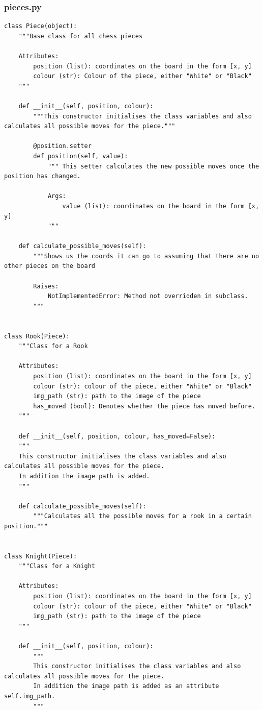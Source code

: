 \subsubsection{pieces.py}
\begin{verbatim}
class Piece(object):
	"""Base class for all chess pieces

	Attributes:
		position (list): coordinates on the board in the form [x, y]
		colour (str): Colour of the piece, either "White" or "Black"
	"""
	
 	def __init__(self, position, colour):
		"""This constructor initialises the class variables and also calculates all possible moves for the piece."""
		
		@position.setter
		def position(self, value):
			""" This setter calculates the new possible moves once the position has changed.
		
			Args:
				value (list): coordinates on the board in the form [x, y]
			"""
	
 	def calculate_possible_moves(self):
		"""Shows us the coords it can go to assuming that there are no other pieces on the board
	
		Raises:
			NotImplementedError: Method not overridden in subclass.
		"""
		

class Rook(Piece):
	"""Class for a Rook

	Attributes:
		position (list): coordinates on the board in the form [x, y]
		colour (str): colour of the piece, either "White" or "Black"
		img_path (str): path to the image of the piece
		has_moved (bool): Denotes whether the piece has moved before.
	"""

    def __init__(self, position, colour, has_moved=False):
	"""
	This constructor initialises the class variables and also calculates all possible moves for the piece.
	In addition the image path is added.
	"""
	
 	def calculate_possible_moves(self):
		"""Calculates all the possible moves for a rook in a certain position."""
		

class Knight(Piece):
	"""Class for a Knight

	Attributes:
		position (list): coordinates on the board in the form [x, y]
		colour (str): colour of the piece, either "White" or "Black"
		img_path (str): path to the image of the piece
	"""

 	def __init__(self, position, colour):
		"""
		This constructor initialises the class variables and also calculates all possible moves for the piece.
		In addition the image path is added as an attribute self.img_path.
		"""
	

\end{verbatim}
